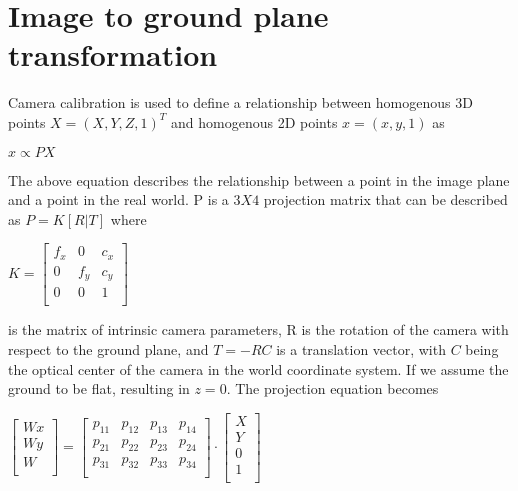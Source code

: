\documentclass[a4paper]{aitthesis}
\begin{document}
\vspace{2cm}


\section{Image to ground plane transformation}
Camera calibration is used to define a relationship between homogenous 3D points $X = (X,Y,Z,1)^{T}$ and homogenous 2D points $x=(x,y,1)$ as 
\begin{center}
$x \propto PX$
\end{center}
The above equation describes the relationship between a point in the image plane and a point in the real world. P is a $3X4$ projection matrix that can be described as $P = K[R|T]$ where
\begin{center}
\large $K=\begin{bmatrix}
f_x & 0 & c_x\\
0 & f_y & c_y \\
0 & 0 & 1 \\
\end{bmatrix}$
\end{center}  is the matrix of intrinsic camera parameters, R is the rotation of the camera with respect to the ground plane, and $T = -RC$ is a translation vector, with $C$ being the optical center of the camera in the world coordinate system.  If we assume the ground to be flat, resulting in $z=0$.
\newline \newline The projection equation becomes
\begin{center}
\large $\begin{bmatrix}
Wx \\
Wy\\
W\\
\end{bmatrix} = 
\begin{bmatrix}
p_{11} & p_{12} & p_{13} & p_{14} \\
p_{21} & p_{22} & p_{23} & p_{24} \\
p_{31} & p_{32} & p_{33} & p_{34}\\
\end{bmatrix}
\cdot \begin{bmatrix}
X \\
Y \\
0 \\
1 \\
\end{bmatrix}$
\end{center}
\end{document}
